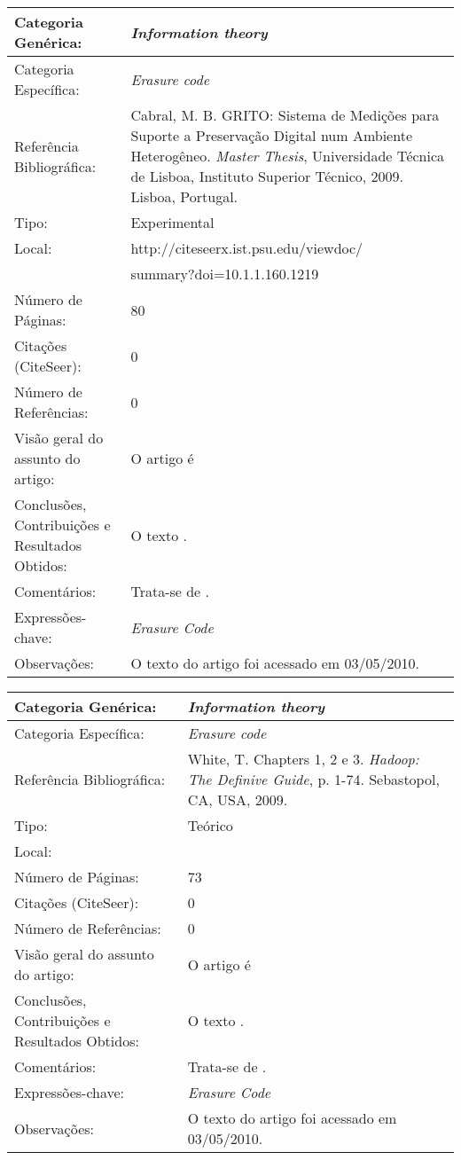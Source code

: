 \documentclass[10pt,a4paper]{article}
\begin{document}
\begin{center}
\begin{tabular}{|p{5cm}||p{10cm}|}
\hline

Categoria Genérica: & \emph{Information theory}\\\hline
Categoria Específica: & \emph{Erasure code}\\\hline
Referência Bibliográfica: & Cabral, M. B. GRITO: Sistema de Medições para Suporte a Preservação Digital num Ambiente Heterogêneo.  \emph{Master Thesis}, Universidade Técnica de Lisboa, Instituto Superior Técnico, 2009. Lisboa, Portugal. \\\hline
Tipo: & Experimental\\\hline
Local: & http://citeseerx.ist.psu.edu/viewdoc/\\ &summary?doi=10.1.1.160.1219\\\hline
Número de Páginas: & 80\\\hline
Citações (CiteSeer): & 0\\\hline
Número de Referências: & 0\\\hline
Visão geral do assunto do artigo: & O artigo é  \\\hline
Conclusões, Contribuições e Resultados Obtidos: &  O texto . \\\hline
Comentários: & Trata-se de . \\\hline
Expressões-chave: & \emph{Erasure Code}\\\hline
Observações: &  O texto do artigo foi acessado em 03/05/2010.\\\hline

\end{tabular}
\end{center}

\begin{center}
\begin{tabular}{|p{5cm}||p{10cm}|}
\hline

Categoria Genérica: & \emph{Information theory}\\\hline
Categoria Específica: & \emph{Erasure code}\\\hline
Referência Bibliográfica: & White, T. Chapters 1, 2 e 3. \emph{Hadoop: The Definive Guide}, p. 1-74. Sebastopol, CA, USA, 2009. \\\hline
Tipo: & Teórico\\\hline
Local: & \\\hline
Número de Páginas: & 73\\\hline
Citações (CiteSeer): & 0\\\hline
Número de Referências: & 0\\\hline
Visão geral do assunto do artigo: & O artigo é  \\\hline
Conclusões, Contribuições e Resultados Obtidos: &  O texto . \\\hline
Comentários: & Trata-se de . \\\hline
Expressões-chave: & \emph{Erasure Code}\\\hline
Observações: &  O texto do artigo foi acessado em 03/05/2010.\\\hline

\end{tabular}
\end{center}
\end{document}
